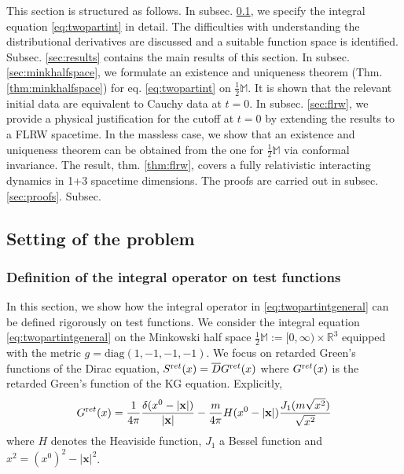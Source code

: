 \documentclass[b5paper,draft,openbib,12pt]{memoir}
\newcommand{\R}{\mathbb{R}}
\newcommand{\M}{\mathbb{M}}
\newcommand{\vx}{\mathbf{x}}
\newcommand{\ret}{{\textup ret}}
\begin{document}
This section is structured as follows. 
In subsec. \ref{sec:setting}, we specify the integral equation 
\eqref{eq:twopartint} in detail. The difficulties 
with understanding 
the distributional derivatives are discussed and a suitable 
function space is identified. Subsec. \ref{sec:results} contains 
the main results of this section. 
In subsec. \ref{sec:minkhalfspace}, we formulate 
an existence and uniqueness theorem (Thm. \ref{thm:minkhalfspace}) 
for eq. \eqref{eq:twopartint} on $\frac{1}{2}\M$. 
It is shown that 
the relevant initial data are equivalent to Cauchy data at $t=0$. 
In subsec. \ref{sec:flrw}, we provide a physical justification for 
the cutoff at $t=0$ by extending the results to a FLRW spacetime. 
In the massless case, we show that an existence and uniqueness 
theorem can be obtained from the one for $\frac{1}{2}\M$ via 
conformal invariance. The result, thm. \ref{thm:flrw}, covers a 
fully relativistic interacting dynamics in 1+3 spacetime 
dimensions. The proofs are carried out in subsec. \ref{sec:proofs}. 
Subsec.



\subsection{Setting of the problem} \label{sec:setting}

\subsubsection{Definition of the integral operator on test functions} \label{sec:aontestfunctions}

In this section, we show how the integral operator in \eqref{eq:twopartintgeneral} can be defined rigorously on test functions.
We consider the integral equation \eqref{eq:twopartintgeneral} on the Minkowski half space $\frac{1}{2}\M := [0,\infty) \times \R^3$ equipped with the metric $g = \text{diag}(1,-1,-1,-1)$. We focus on retarded Green's functions of the Dirac equation, $S^\ret(x) = \overline{D} G^\ret(x)$ where $G^\ret(x)$ is the retarded Green's function of the KG equation. Explicitly,
\begin{equation}
	G^\ret(x) = \frac{1}{4\pi} \frac{\delta(x^0-|\vx|)}{|\vx|} - \frac{m}{4\pi} H(x^0-|\vx|) \frac{J_1(m \sqrt{x^2})}{\sqrt{x^2}}
\end{equation}
where $H$ denotes the Heaviside function, $J_1$ a Bessel function and $x^2 = (x^0)^2 - |\vx|^2$.
\end{document}
